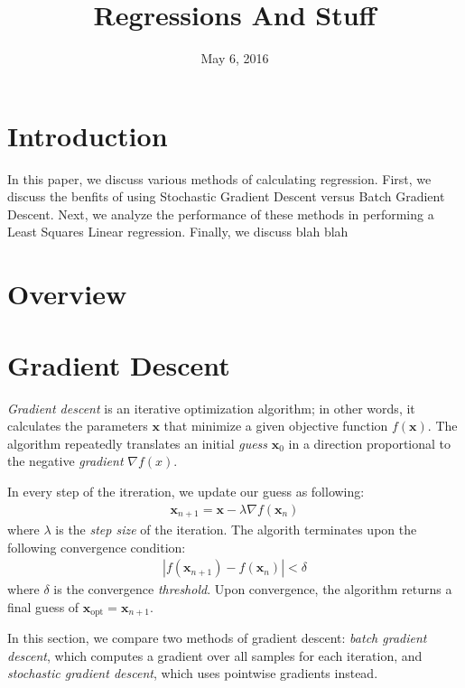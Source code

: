 \documentclass[letterpaper, twocolumn,10pt]{article}
\title{\textbf{Regressions And Stuff}}
\author{}
\date{May 6, 2016}
\begin{document}

\maketitle
\section{Introduction}

In this paper, we discuss various methods of calculating regression. First, we discuss the benfits of using Stochastic Gradient Descent versus Batch Gradient Descent. Next, we analyze the performance of these methods in performing a Least Squares Linear regression. Finally, we discuss blah blah

\section{Overview}


\section{Gradient Descent}

\emph{Gradient descent} is an iterative optimization algorithm; in other words, it calculates the parameters $\mathbf{x}$ that minimize a given objective function $f(\mathbf{x})$. The algorithm repeatedly translates an initial \emph{guess} $\mathbf{x}_0$ in a direction proportional to the negative \emph{gradient} $\nabla f(x)$.

In every step of the itreration, we update our guess as following:
\begin{align*}
\mathbf{x}_{n+1} = \mathbf{x} - \lambda \nabla f(\mathbf{x}_{n})
\end{align*}
where $\lambda$ is the \emph{step size} of the iteration. The algorith terminates upon the following convergence condition: 
\begin{align*}
|f(\mathbf{x}_{n+1}) - f(\mathbf{x}_{n})| < \delta
\end{align*}
where $\delta$ is the convergence \emph{threshold}. Upon convergence, the algorithm returns a final guess of $\mathbf{x}_{\text{opt}} = \mathbf{x}_{n+1}$.

In this section, we compare two methods of gradient descent: \emph{batch gradient descent}, which computes a gradient over all samples for each iteration, and \emph{stochastic gradient descent}, which uses pointwise gradients instead.
\end{document}
